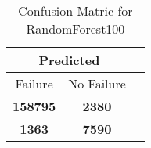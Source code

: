 \begin{table}[] 
\caption{Confusion Matric for RandomForest100} 
\label{Table: Prediction Accuracy-NoneRandomForest10070.0EKF-ignoreReflection-Reflection} 
\centering 
\begin{tabular} 
 {@{}ccc@{}} 
\toprule 
\multicolumn{2}{c}{\textbf{Predicted}}
 \\ \midrule 
\multicolumn{1}{|c|}{Failure} & 
\multicolumn{1}{c|}{No Failure}
 \\ \midrule 
\multicolumn{1}{|c|}{\color{green}\textbf{158795}} & 
\multicolumn{1}{c|}{\color{red}\textbf{2380}}
 \\ \midrule 
\multicolumn{1}{|c|}{\color{red}\textbf{1363}} & 
\multicolumn{1}{c|}{\color{green}\textbf{7590}}
 \\ \bottomrule 
\end{tabular} 
\end{table} 
